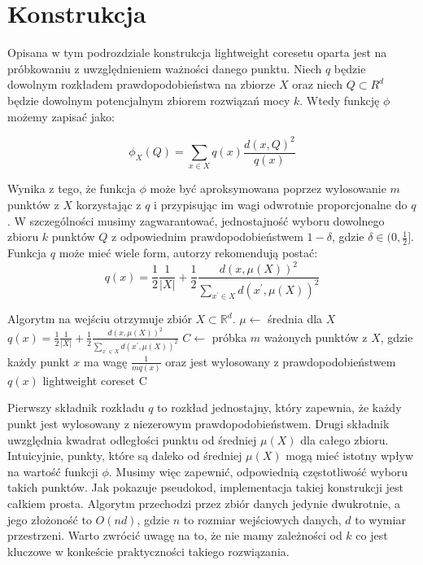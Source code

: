 \section{Konstrukcja}\label{construction}

Opisana w tym podrozdziale konstrukcja lightweight coresetu oparta jest na próbkowaniu z uwzględnieniem ważności danego punktu.
Niech $q$ będzie dowolnym rozkładem prawdopodobieństwa na zbiorze $X$ oraz niech $Q \subset R^{d}$ będzie dowolnym potencjalnym zbiorem rozwiązań mocy $k$. 
Wtedy funkcję $\phi$ możemy zapisać jako:

\begin{equation}
    \phi_{X}(Q) = \sum_{x \in X} q(x) \frac{d(x, Q)^{2}}{q(x)}
\end{equation}

\noindent
Wynika z tego, że funkcja $\phi$ może być aproksymowana poprzez wylosowanie $m$ punktów z $X$ korzystając z $q$ i przypisując im wagi odwrotnie proporcjonalne do $q$.
W szczególności musimy zagwarantować, jednostajność wyboru dowolnego zbioru $k$ punktów $Q$ z odpowiednim prawdopodobieństwem $1 - \delta$, gdzie $\delta \in (0, \frac{1}{2}]$.
Funkcja $q$ może mieć wiele form, autorzy \cite{bachem2017scalable} rekomendują postać:
\begin{equation}
    q(x) = \frac{1}{2}\frac{1}{|X|} + \frac{1}{2}\frac{d(x, \mu(X))^2}{\sum_{x^{'} \in X}d(x^{'}, \mu(X))^2}
\end{equation}

\begin{algorithm}
    \caption{}
\begin{algorithmic}
    \State Algorytm na wejściu otrzymuje zbiór $X \subset \mathbb{R}^{d}$.
        \State $\mu \leftarrow$ średnia dla $X$
            \State $q(x) = \frac{1}{2}\frac{1}{|X|} + \frac{1}{2}\frac{d(x, \mu(X))^2}{\sum_{x^{'} \in X}d(x^{'}, \mu(X))^2}$
        \EndFor
        \State $C \leftarrow$ próbka $m$ ważonych punktów z $X$, gdzie każdy punkt $x$ ma wagę $\frac{1}{mq(x)}$ oraz jest wylosowany z prawdopodobieństwem $q(x)$
    \EndProcedure
    \Return lightweight coreset C
\end{algorithmic}
\end{algorithm}

\noindent
Pierwszy składnik rozkładu $q$ to rozkład jednostajny, który zapewnia, że każdy punkt jest wylosowany z niezerowym prawdopodobieństwem.
Drugi składnik uwzględnia kwadrat odległości punktu od średniej $\mu(X)$ dla całego zbioru.
Intuicyjnie, punkty, które są daleko od średniej $\mu(X)$ mogą mieć istotny wpływ na wartość funkcji $\phi$.
Musimy więc zapewnić, odpowiednią częstotliwość wyboru takich punktów. 
Jak pokazuje pseudokod, implementacja takiej konstrukcji jest całkiem prosta.
Algorytm przechodzi przez zbiór danych jedynie dwukrotnie, a jego złożoność to $O(nd)$, gdzie $n$ to rozmiar wejściowych danych, $d$ to wymiar przestrzeni. 
Warto zwrócić uwagę na to, że nie mamy zależności od $k$ co jest kluczowe w konkeście praktyczności takiego rozwiązania.